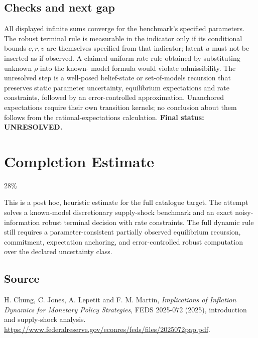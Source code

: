 \documentclass[11pt]{article}
\begin{document}
\subsection*{Checks and next gap}
All displayed infinite sums converge for the benchmark's specified
parameters. The robust terminal rule is measurable in the indicator only
if its conditional bounds $c,r,v$ are themselves specified from that
indicator; latent $u$ must not be inserted as if observed. A claimed
uniform rate rule obtained by substituting unknown $\rho$ into the known-
model formula would violate admissibility. The unresolved step is a
well-posed belief-state or set-of-models recursion that preserves static
parameter uncertainty, equilibrium expectations and rate constraints,
followed by an error-controlled approximation. Unanchored expectations
require their own transition kernels; no conclusion about them follows
from the rational-expectations calculation.
\textbf{Final status: UNRESOLVED.}

\section{Completion Estimate}
28\%

This is a post hoc, heuristic estimate for the full catalogue target.
The attempt solves a known-model discretionary supply-shock benchmark and an exact noisy-information robust terminal decision with rate constraints. The full dynamic rule still requires a parameter-consistent partially observed equilibrium recursion, commitment, expectation anchoring, and error-controlled robust computation over the declared uncertainty class.

\subsection*{Source}
H. Chung, C. Jones, A. Lepetit and F. M. Martin,
\emph{Implications of Inflation Dynamics for Monetary Policy Strategies},
FEDS 2025-072 (2025), introduction and supply-shock analysis.
\url{https://www.federalreserve.gov/econres/feds/files/2025072pap.pdf}.
\end{document}
